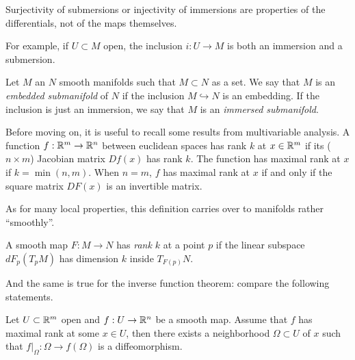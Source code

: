 \begin{remark}
  Surjectivity of submersions or injectivity of immersions are properties of the differentials, not of the maps themselves.
  
  For example, if $U\subset M$ open, the inclusion $i: U \to M$ is both an immersion and a submersion.
\end{remark}

\begin{definition}
  Let $M$ an $N$ smooth manifolds such that $M\subset N$ as a set.
  We say that $M$ is an \emph{embedded submanifold} of $N$ if the inclusion $M\hookrightarrow N$ is an embedding. If the inclusion is just an immersion, we say that $M$ is an \emph{immersed submanifold}.
\end{definition}

Before moving on, it is useful to recall some results from multivariable analysis.
A function $f:\mathbb{R}^m \to \mathbb{R}^n$ between euclidean spaces has rank $k$ at $x\in\mathbb{R}^m$ if its ($n\times m$) Jacobian matrix $Df(x)$ has rank $k$.
The function has maximal rank at $x$ if $k = \min(n,m)$.
When $n=m$, $f$ has maximal rank at $x$ if and only if the square matrix $DF(x)$ is an invertible matrix.

As for many local properties, this definition carries over to manifolds rather ``smoothly''.

\begin{definition}
  A smooth map $F:M\to N$ has \emph{rank $k$} at a point $p$ if the linear subspace $dF_p(T_pM)$ has dimension $k$ inside $T_{F(p)}N$.
\end{definition}

And the same is true for the inverse function theorem:
compare the following statements.

\begin{theorem}\label{thm:ift}
  Let $U\subset\mathbb{R}^m$ open and $f:U \to \mathbb{R}^n$ be a smooth map.
  Assume that $f$ has maximal rank at some $x\in U$, then there exists a neighborhood $\Omega\subset U$ of $x$ such that  $f\big|_\Omega : \Omega \to f(\Omega)$ is a diffeomorphism.
\end{theorem}

